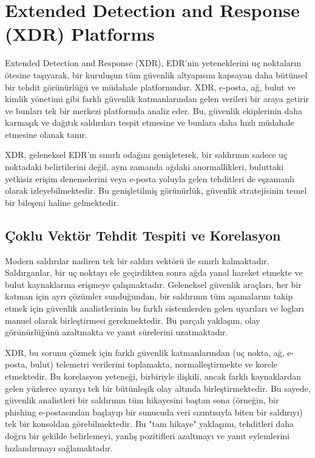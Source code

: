 \section{Extended Detection and Response (XDR) Platforms}

Extended Detection and Response (XDR), EDR'nin yeteneklerini uç noktaların ötesine taşıyarak, bir kuruluşun tüm güvenlik altyapısını kapsayan daha bütünsel bir tehdit görünürlüğü ve müdahale platformudur. XDR, e-posta, ağ, bulut ve kimlik yönetimi gibi farklı güvenlik katmanlarından gelen verileri bir araya getirir ve bunları tek bir merkezi platformda analiz eder. Bu, güvenlik ekiplerinin daha karmaşık ve dağıtık saldırıları tespit etmesine ve bunlara daha hızlı müdahale etmesine olanak tanır.

XDR, geleneksel EDR'ın sınırlı odağını genişleterek, bir saldırının sadece uç noktadaki belirtilerini değil, aynı zamanda ağdaki anormallikleri, buluttaki yetkisiz erişim denemelerini veya e-posta yoluyla gelen tehditleri de eşzamanlı olarak izleyebilmektedir. Bu genişletilmiş görünürlük, güvenlik stratejisinin temel bir bileşeni haline gelmektedir.

\subsection{Çoklu Vektör Tehdit Tespiti ve Korelasyon}

Modern saldırılar nadiren tek bir saldırı vektörü ile sınırlı kalmaktadır. Saldırganlar, bir uç noktayı ele geçirdikten sonra ağda yanal hareket etmekte ve bulut kaynaklarına erişmeye çalışmaktadır. Geleneksel güvenlik araçları, her bir katman için ayrı çözümler sunduğundan, bir saldırının tüm aşamalarını takip etmek için güvenlik analistlerinin bu farklı sistemlerden gelen uyarıları ve logları manuel olarak birleştirmesi gerekmektedir. Bu parçalı yaklaşım, olay görünürlüğünü azaltmakta ve yanıt sürelerini uzatmaktadır.

XDR, bu sorunu çözmek için farklı güvenlik katmanlarından (uç nokta, ağ, e-posta, bulut) telemetri verilerini toplamakta, normalleştirmekte ve korele etmektedir. Bu korelasyon yeteneği, birbiriyle ilişkili, ancak farklı kaynaklardan gelen yüzlerce uyarıyı tek bir bütünleşik olay altında birleştirmektedir. Bu sayede, güvenlik analistleri bir saldırının tüm hikayesini baştan sona (örneğin, bir phishing e-postasından başlayıp bir sunucuda veri sızıntısıyla biten bir saldırıyı) tek bir konsoldan görebilmektedir. Bu "tam hikaye" yaklaşımı, tehditleri daha doğru bir şekilde belirlemeyi, yanlış pozitifleri azaltmayı ve yanıt eylemlerini hızlandırmayı sağlamaktadır.

